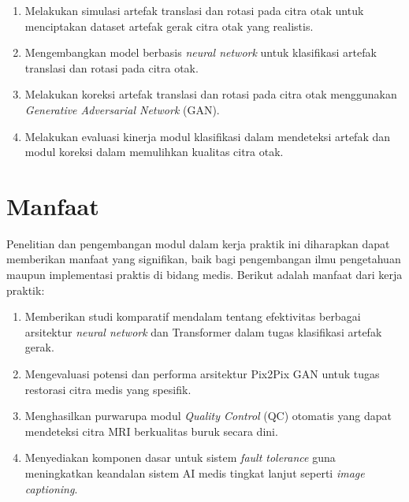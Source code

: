 \begin{enumerate}[nolistsep]

  \item Melakukan simulasi artefak translasi dan rotasi pada citra otak untuk menciptakan dataset artefak gerak citra otak yang realistis.
  
  \item Mengembangkan model berbasis \textit{neural network} untuk klasifikasi artefak translasi dan rotasi pada citra otak.
  
  \item Melakukan koreksi artefak translasi dan rotasi pada citra otak menggunakan \textit{Generative Adversarial Network} (GAN).
  
  \item Melakukan evaluasi kinerja modul klasifikasi dalam mendeteksi artefak dan modul koreksi dalam memulihkan kualitas citra otak.

\end{enumerate}

\section{Manfaat}

Penelitian dan pengembangan modul dalam kerja praktik ini diharapkan dapat memberikan manfaat yang signifikan, baik bagi pengembangan ilmu pengetahuan maupun implementasi praktis di bidang medis. Berikut adalah manfaat dari kerja praktik:

\begin{enumerate}[nolistsep]

	\item Memberikan studi komparatif mendalam tentang efektivitas berbagai arsitektur \textit{neural network} dan Transformer dalam tugas klasifikasi artefak gerak.
	
	\item Mengevaluasi potensi dan performa arsitektur Pix2Pix GAN untuk tugas restorasi citra medis yang spesifik.
	
	\item Menghasilkan purwarupa modul \textit{Quality Control} (QC) otomatis yang dapat mendeteksi citra MRI berkualitas buruk secara dini.
	
	\item Menyediakan komponen dasar untuk sistem \textit{fault tolerance} guna meningkatkan keandalan sistem AI medis tingkat lanjut seperti \textit{image captioning}.
	
\end{enumerate}

